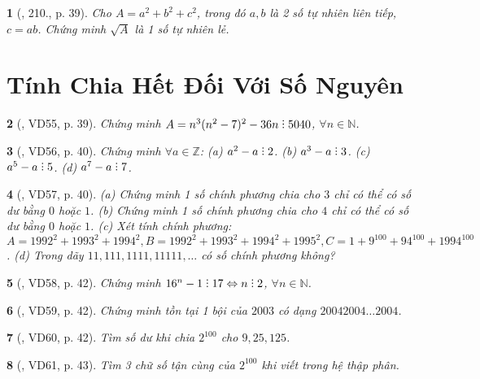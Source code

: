 \documentclass{article}
\newtheorem{baitoan}{}
\DeclareRobustCommand{\divby}{%
	\mathrel{\vbox{\baselineskip.65ex\lineskiplimit0pt\hbox{.}\hbox{.}\hbox{.}}}%
}
\begin{document}
\begin{baitoan}[\cite{Binh_Toan_8_tap_1}, 210., p. 39]
	Cho $A = a^2 + b^2 + c^2$, trong đó $a,b$ là 2 số tự nhiên liên tiếp, $c = ab$. Chứng minh $\sqrt{A}$ là 1 số tự nhiên lẻ.
\end{baitoan}


\section{Tính Chia Hết Đối Với Số Nguyên}

\begin{baitoan}[\cite{Binh_Toan_8_tap_1}, VD55, p. 39]
	Chứng minh $A = n^3(n^2 - 7)^2 - 36n\divby5040$, $\forall n\in\mathbb{N}$.
\end{baitoan}

\begin{baitoan}[\cite{Binh_Toan_8_tap_1}, VD56, p. 40]
	Chứng minh $\forall a\in\mathbb{Z}$: (a) $a^2 - a\divby2$. (b) $a^3 - a\divby3$. (c) $a^5 - a\divby5$. (d) $a^7 - a\divby7$.
\end{baitoan}

\begin{baitoan}[\cite{Binh_Toan_8_tap_1}, VD57, p. 40]
	(a) Chứng minh 1 số chính phương chia cho $3$ chỉ có thể có số dư bằng $0$ hoặc $1$. (b) Chứng minh 1 số chính phương chia cho $4$ chỉ có thể có số dư bằng $0$ hoặc $1$. (c) Xét tính chính phương: $A = 1992^2 + 1993^2 + 1994^2,B = 1992^2 + 1993^2 + 1994^2 + 1995^2,C = 1 + 9^{100} + 94^{100} + 1994^{100}$. (d) Trong dãy $11,111,1111,11111,\ldots$ có số chính phương không?
\end{baitoan}

\begin{baitoan}[\cite{Binh_Toan_8_tap_1}, VD58, p. 42]
	Chứng minh $16^n - 1\divby17\Leftrightarrow n\divby2$, $\forall n\in\mathbb{N}$.
\end{baitoan}

\begin{baitoan}[\cite{Binh_Toan_8_tap_1}, VD59, p. 42]
	Chứng minh tồn tại 1 bội của $2003$ có dạng $20042004\ldots2004$.
\end{baitoan}

\begin{baitoan}[\cite{Binh_Toan_8_tap_1}, VD60, p. 42]
	Tìm số dư khi chia $2^{100}$ cho $9,25,125$.
\end{baitoan}

\begin{baitoan}[\cite{Binh_Toan_8_tap_1}, VD61, p. 43]
	Tìm 3 chữ số tận cùng của $2^{100}$ khi viết trong hệ thập phân.
\end{baitoan}
\end{document}
